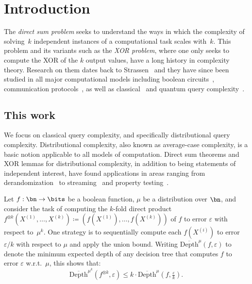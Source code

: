 \setcounter{page}{1}


\section{Introduction}


The {\sl direct sum problem} seeks to understand the ways in which the complexity of solving~$k$ independent instances of a computational task scales with~$k$. This problem and its variants such as the {\sl XOR problem}, where one only seeks to compute the XOR of the $k$ output values, have a long history in complexity theory.  Research on them dates back to Strassen~\cite{Str73} and they have since been  studied in all major computational models including boolean circuits~\cite{Yao82,Lev85,GNW11,Imp95,IW97,OD02,IJKW08,Dru13}, communication protocols~\cite{IRW94,Sha04,KSdW07,LSS08,VW08,Kla10,She11,Jai15,JPY12,BBCR10,BRWY13,Yu22}, as well as classical~\cite{IRW94,NRS94,Sha04,KSdW07,Dru12,BDK18,BB19,BKLS23,Hoza23} and quantum query complexity~\cite{ASdW06,KSdW07,Spa08,She11,AMRR11,LR13}. 

\subsection{This work} 

We focus on classical query complexity, and specifically distributional query complexity. Distributional complexity, also known as average-case complexity, is a basic notion applicable to all models of computation. Direct sum theorems and XOR lemmas for distributional complexity, in addition to being statements of independent interest, have found applications in areas ranging from derandomization~\cite{Yao82,NW94,IW97} to streaming~\cite{AN21} and property testing~\cite{BKST23}.

Let $f: \bn \to \bits$  be a boolean function, $\mu$ be a distribution over $\bn$, and consider the task of computing the $k$-fold direct product $f^{\otimes k}(X^{(1)},\ldots,X^{(k)}) \coloneqq (f(X^{(1)}),\ldots,f(X^{(k)}))$ of $f$ to error $\varepsilon$ with respect to~$\mu^k$. One strategy is to sequentially compute each $f(X^{(i)})$ to error $\varepsilon/k$ with respect to $\mu$ and apply the union bound. Writing $\overline{\mathrm{Depth}}^{\mu}(f,\varepsilon)$ to denote the minimum expected depth of any decision tree that computes $f$ to error $\varepsilon$ w.r.t.~$\mu$, this shows that: %
\begin{equation*}
\overline{\mathrm{Depth}}^{\mu^k}(f^{\otimes k},\varepsilon) \le k \cdot \overline{\mathrm{Depth}}^{\mu}(f,\tfrac{\varepsilon}{k}).
\label{eq:naive upper bound}
\end{equation*}

